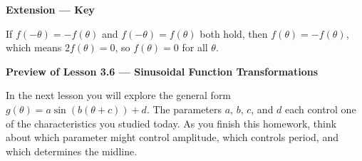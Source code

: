 \documentclass[10pt]{article}
\begin{document}
\vspace{0.08in}

\begin{extensionbox}
\textbf{Extension --- Key}

If $f(-\theta) = -f(\theta)$ and $f(-\theta) = f(\theta)$ both hold, then
$f(\theta) = -f(\theta)$, which means $2f(\theta) = 0$, so $f(\theta) = 0$ for
all $\theta$.

\end{extensionbox}

\vspace{0.08in}

\begin{tcolorbox}[colback=goldbg, colframe=goldacc, arc=2mm,
    left=3mm, right=3mm, top=2mm, bottom=2mm]
\textbf{Preview of Lesson 3.6 --- Sinusoidal Function Transformations}

In the next lesson you will explore the general form
$g(\theta) = a\sin(b(\theta + c)) + d$.
The parameters $a$, $b$, $c$, and $d$ each control one of the characteristics
you studied today. As you finish this homework, think about which parameter
might control amplitude, which controls period, and which determines the midline.
\end{tcolorbox}
\end{document}
